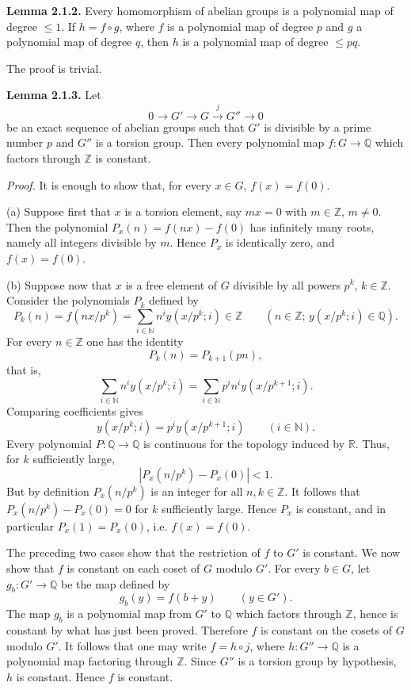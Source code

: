 \documentclass[11pt]{article}
\begin{document}
\textbf{Lemma 2.1.2.} Every homomorphism of abelian groups is a polynomial map of degree $\leq1$. If $h=f\circ g$, where $f$ is a polynomial map of degree $p$ and $g$ a polynomial map of degree $q$, then $h$ is a polynomial map of degree $\leq pq$.

The proof is trivial.

\textbf{Lemma 2.1.3.} Let
\[
0\longrightarrow G'\longrightarrow G\xrightarrow{j}G''\longrightarrow0
\]
be an exact sequence of abelian groups such that $G'$ is divisible by a prime number $p$ and $G''$ is a torsion group. Then every polynomial map $f:G\to\mathbb Q$ which factors through $\mathbb Z$ is constant.

\emph{Proof.} It is enough to show that, for every $x\in G$, $f(x)=f(0)$.

(a) Suppose first that $x$ is a torsion element, say $mx=0$ with $m\in\mathbb Z$, $m\ne0$. Then the polynomial $P_x(n)=f(nx)-f(0)$ has infinitely many roots, namely all integers divisible by $m$. Hence $P_x$ is identically zero, and $f(x)=f(0)$.

(b) Suppose now that $x$ is a free element of $G$ divisible by all powers $p^k$, $k\in\mathbb Z$. Consider the polynomials $P_k$ defined by
\[
 P_k(n)=f(nx/p^k)=\sum_{i\in\mathbb N}n^i y(x/p^k;i)\in\mathbb Z
 \qquad(n\in\mathbb Z;\, y(x/p^k;i)\in\mathbb Q).
\]
For every $n\in\mathbb Z$ one has the identity
\[
 P_k(n)=P_{k+1}(pn),
\]
that is,
\[
 \sum_{i\in\mathbb N}n^i y(x/p^k;i)=
 \sum_{i\in\mathbb N}p^i n^i y(x/p^{k+1};i).
\]
Comparing coefficients gives
\[
 y(x/p^k;i)=p^i y(x/p^{k+1};i)\qquad (i\in\mathbb N).
\]
Every polynomial $P: \mathbb Q\to\mathbb Q$ is continuous for the topology induced by $\mathbb R$. Thus, for $k$ sufficiently large,
\[
 |P_x(n/p^k)-P_x(0)|<1.
\]
But by definition $P_x(n/p^k)$ is an integer for all $n,k\in\mathbb Z$. It follows that $P_x(n/p^k)-P_x(0)=0$ for $k$ sufficiently large. Hence $P_x$ is constant, and in particular $P_x(1)=P_x(0)$, i.e. $f(x)=f(0)$.

The preceding two cases show that the restriction of $f$ to $G'$ is constant. We now show that $f$ is constant on each coset of $G$ modulo $G'$. For every $b\in G$, let $g_b:G'\to\mathbb Q$ be the map defined by
\[
 g_b(y)=f(b+y)\qquad (y\in G').
\]
The map $g_b$ is a polynomial map from $G'$ to $\mathbb Q$ which factors through $\mathbb Z$, hence is constant by what has just been proved. Therefore $f$ is constant on the cosets of $G$ modulo $G'$. It follows that one may write $f=h\circ j$, where $h:G''\to\mathbb Q$ is a polynomial map factoring through $\mathbb Z$. Since $G''$ is a torsion group by hypothesis, $h$ is constant. Hence $f$ is constant.
\end{document}
